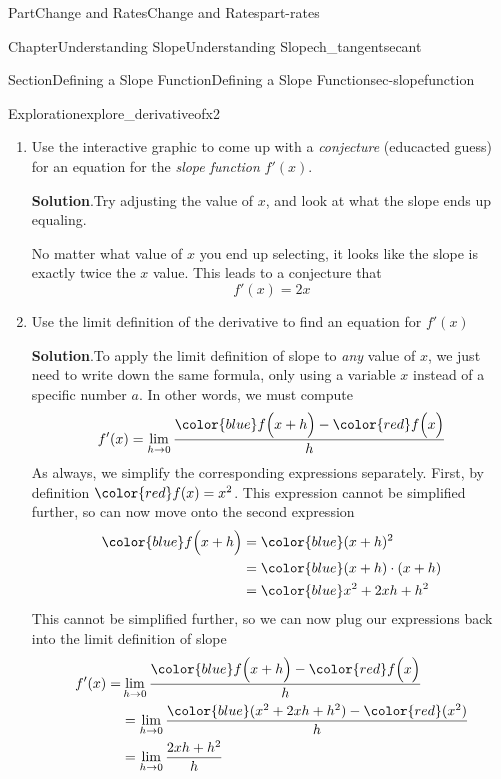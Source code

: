 \documentclass[oneside,10pt,]{tufte-book}
\newcommand{\blocktitlefont}{\relax}
\numberwithin{equation}{chapter}
\newcommand{\amp}{&}
\begin{document}
\begin{partptx}{Part}{Change and Rates}{}{Change and Rates}{}{}{part-rates}
\begin{chapterptx}{Chapter}{Understanding Slope}{}{Understanding Slope}{}{}{ch_tangentsecant}
\begin{sectionptx}{Section}{Defining a Slope Function}{}{Defining a Slope Function}{}{}{sec-slopefunction}
\begin{exploration}{Exploration}{}{explore_derivativeofx2}
\begin{enumerate}[font=\bfseries,label=(\alph*),ref=\alph*]
%
\begin{equation*}
f'(1) = 2
\end{equation*}
%
\item{}Use the interactive graphic to come up with a \emph{conjecture} (educacted guess) for an equation for the \emph{slope function} \(f'(x)\).%
\par\smallskip%
\noindent\textbf{\blocktitlefont Solution}.\hypertarget{explore_derivativeofx2-3-2}{}\quad{}Try adjusting the value of \(x\), and look at what the slope ends up equaling.%
\par
No matter what value of \(x\) you end up selecting, it looks like the slope is exactly twice the \(x\) value. This leads to a conjecture that%
\begin{equation*}
f'(x) = 2x
\end{equation*}
%
\item{}Use the limit definition of the derivative to find an equation for \(f'(x)\)%
\par\smallskip%
\noindent\textbf{\blocktitlefont Solution}.\hypertarget{explore_derivativeofx2-4-2}{}\quad{}To apply the limit definition of slope to \emph{any} value of \(x\), we just need to write down the same formula, only using a variable \(x\) instead of a specific number \(a\).  In other words, we must compute%
\begin{equation*}
f'(x) =  \lim_{h\rightarrow 0} \dfrac{{\color{blue} f\Big(x+h\Big)} - {\color{red} f\Big(x\Big)} }{h}
\end{equation*}
As always, we simplify the corresponding expressions separately.  First, by definition \(\color{red} f(x) = x^2\).  This expression cannot be simplified further, so can now move onto the second expression%
\begin{align*}
\color{blue} f\Big(x+h\Big) \amp = \color{blue} (x+h)^2 \\
\amp = \color{blue} (x+h)\cdot (x+h) \\
\amp = \color{blue} x^2 + 2xh + h^2 
\end{align*}
This cannot be simplified further, so we can now plug our expressions back into the limit definition of slope%
\begin{align*}
f'(x) = \amp \lim_{h\rightarrow 0} \dfrac{{\color{blue} f\Big(x+h\Big)} - {\color{red} f\Big(x\Big)} }{h} \\
\amp =  \lim_{h\rightarrow 0}\dfrac{  {\color{blue} (x^2 + 2xh + h^2)} - {\color{red} (x^2)}  }{h}\\
\amp =  \lim_{h\rightarrow 0}\dfrac{  2xh + h^2  }{h} \\

\end{align*}
\end{enumerate}
\end{exploration}
\end{sectionptx}
\end{chapterptx}
\end{partptx}
\end{document}
